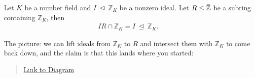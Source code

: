 \begin{lemma}

Let \(K\) be a number field and \(I {~\trianglelefteq~}{\mathbb{Z}}_K\)
be a nonzero ideal. Let
\(R \leq \mkern 1.5mu\overline{\mkern-1.5mu{\mathbb{Z}}\mkern-1.5mu}\mkern 1.5mu\)
be a subring containing \({\mathbb{Z}}_K\), then
\begin{align*}
IR \cap{\mathbb{Z}}_K = I {~\trianglelefteq~}{\mathbb{Z}}_K
.\end{align*}

The picture: we can lift ideals from \({\mathbb{Z}}_K\) to \(R\) and
intersect them with \({\mathbb{Z}}_K\) to come back down, and the claim
is that this lands where you started:

\begin{center}
\end{center}

\begin{quote}
\href{https://q.uiver.app/?q=WzAsNixbMCw0LCJcXFpaX0siXSxbMCwyLCJSIl0sWzAsMCwiXFxiYXJ7XFxaWn0iXSxbMiw0LCJJIl0sWzIsMiwiSVIiXSxbNCw0LCJJUiBcXGludGVyc2VjdCBcXFpaX0siXSxbMCwxLCIiLDAseyJzdHlsZSI6eyJ0YWlsIjp7Im5hbWUiOiJob29rIiwic2lkZSI6InRvcCJ9fX1dLFsxLDIsIiIsMCx7InN0eWxlIjp7InRhaWwiOnsibmFtZSI6Imhvb2siLCJzaWRlIjoidG9wIn19fV0sWzMsNCwiKFxcd2FpdCkgXFxjZG90IFIiXSxbNCw1LCJcXHdhaXQgXFxpbnRlcnNlY3QgXFxaWl9LIl0sWzMsNSwiIiwyLHsibGV2ZWwiOjIsImNvbG91ciI6WzE4MCw2MCw2MF0sInN0eWxlIjp7ImhlYWQiOnsibmFtZSI6Im5vbmUifX19XV0=}{Link
to Diagram}
\end{quote}

\end{lemma}

